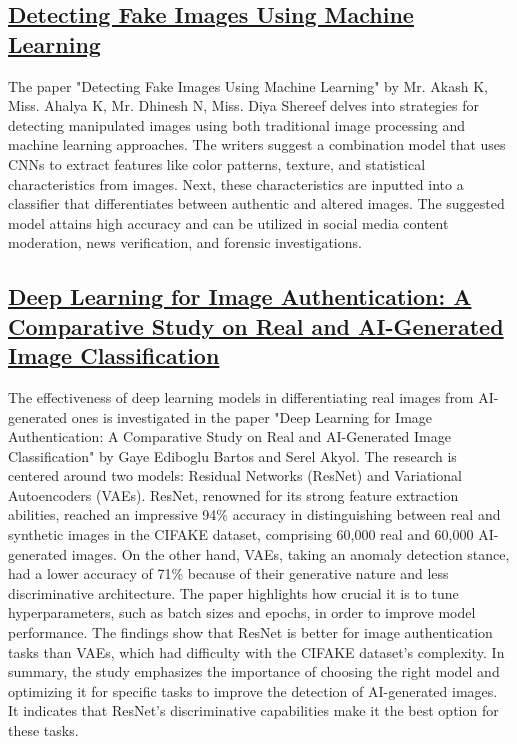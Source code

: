 \documentclass[10pt,twocolumn,letterpaper]{article}
\begin{document}
\subsection{\href{https://ijrpr.com/uploads/V4ISSUE4/IJRPR11629.pdf}{Detecting Fake Images Using Machine Learning}}
The paper "Detecting Fake Images Using Machine Learning" by Mr. Akash K, Miss. Ahalya K, Mr. Dhinesh N, Miss. Diya Shereef delves into strategies for detecting manipulated images using both traditional image processing and machine learning approaches. The writers suggest a combination model that uses CNNs to extract features like color patterns, texture, and statistical characteristics from images. Next, these characteristics are inputted into a classifier that differentiates between authentic and altered images. The suggested model attains high accuracy and can be utilized in social media content moderation, news verification, and forensic investigations.

\subsection{\href{https://www.researchgate.net/publication/375952278_Deep_Learning_for_Image_Authentication_A_Comparative_Study_on_Real_and_AI-Generated_Image_Classification}{Deep Learning for Image Authentication: A Comparative Study on Real and AI-Generated Image Classification}}
The effectiveness of deep learning models in differentiating real images from AI-generated ones is investigated in the paper "Deep Learning for Image Authentication: A Comparative Study on Real and AI-Generated Image Classification" by Gaye Ediboglu Bartos and Serel Akyol. The research is centered around two models: Residual Networks (ResNet) and Variational Autoencoders (VAEs). ResNet, renowned for its strong feature extraction abilities, reached an impressive 94\% accuracy in distinguishing between real and synthetic images in the CIFAKE dataset, comprising 60,000 real and 60,000 AI-generated images. On the other hand, VAEs, taking an anomaly detection stance, had a lower accuracy of 71\% because of their generative nature and less discriminative architecture. The paper highlights how crucial it is to tune hyperparameters, such as batch sizes and epochs, in order to improve model performance. The findings show that ResNet is better for image authentication tasks than VAEs, which had difficulty with the CIFAKE dataset's complexity. In summary, the study emphasizes the importance of choosing the right model and optimizing it for specific tasks to improve the detection of AI-generated images. It indicates that ResNet's discriminative capabilities make it the best option for these tasks.
\end{document}
